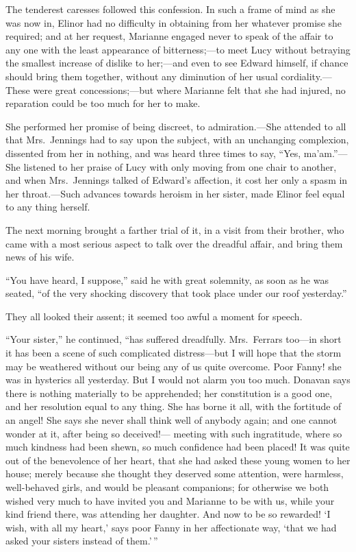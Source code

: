 \documentclass{article}
\begin{document}
The tenderest caresses followed this confession.
In such a frame of mind as she was now in, Elinor had
no difficulty in obtaining from her whatever promise
she required; and at her request, Marianne engaged
never to speak of the affair to any one with the least
appearance of bitterness;---to meet Lucy without betraying
the smallest increase of dislike to her;---and even to see
Edward himself, if chance should bring them together,
without any diminution of her usual cordiality.---%
These were great concessions;---but where Marianne felt
that she had injured, no reparation could be too much
for her to make.

She performed her promise of being discreet,
to admiration.---She attended to all that Mrs.\ Jennings
had to say upon the subject, with an unchanging complexion,
dissented from her in nothing, and was heard three
times to say, ``Yes, ma'am.''---She listened to her praise
of Lucy with only moving from one chair to another,
and when Mrs.\ Jennings talked of Edward's affection,
it cost her only a spasm in her throat.---Such advances
towards heroism in her sister, made Elinor feel equal
to any thing herself.

The next morning brought a farther trial of it,
in a visit from their brother, who came with a most serious
aspect to talk over the dreadful affair, and bring them
news of his wife.

``You have heard, I suppose,'' said he with great solemnity,
as soon as he was seated, ``of the very shocking discovery
that took place under our roof yesterday.''

They all looked their assent; it seemed too awful
a moment for speech.

``Your sister,'' he continued, ``has suffered dreadfully.
Mrs.\ Ferrars too---in short it has been a scene of such
complicated distress---but I will hope that the storm may
be weathered without our being any of us quite overcome.
Poor Fanny! she was in hysterics all yesterday.
But I would not alarm you too much.  Donavan says there
is nothing materially to be apprehended; her constitution
is a good one, and her resolution equal to any thing.
She has borne it all, with the fortitude of an angel!
She says she never shall think well of anybody again;
and one cannot wonder at it, after being so deceived!---%
meeting with such ingratitude, where so much kindness
had been shewn, so much confidence had been placed!  It
was quite out of the benevolence of her heart, that she
had asked these young women to her house; merely because
she thought they deserved some attention, were harmless,
well-behaved girls, and would be pleasant companions;
for otherwise we both wished very much to have invited you
and Marianne to be with us, while your kind friend there,
was attending her daughter.  And now to be so rewarded!
`I wish, with all my heart,' says poor Fanny in her
affectionate way, `that we had asked your sisters instead
of them.'\,''
\end{document}
